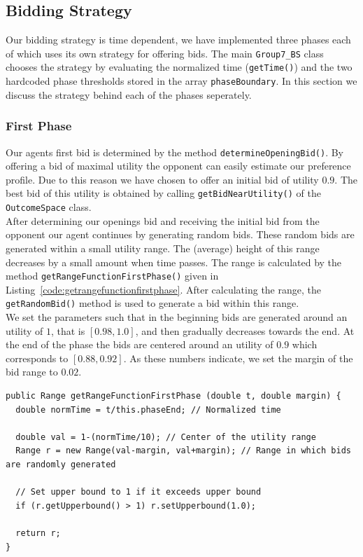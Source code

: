 \documentclass[a4paper,10pt]{article}
\begin{document}
\subsection{Bidding Strategy}
\label{sec:strategyBS}
Our bidding strategy is time dependent, we have implemented three phases each of which uses its own strategy for offering bids. The main \texttt{Group7\_BS} class chooses the strategy by evaluating the normalized time (\texttt{getTime()}) and the two hardcoded phase thresholds stored in the array \texttt{phaseBoundary}. In this section we discuss the strategy behind each of the phases seperately.

\subsubsection{First Phase}
Our agents first bid is determined by the method \texttt{determineOpeningBid()}. By offering a bid of maximal utility the opponent can easily estimate our preference profile. Due to this reason we have chosen to offer an initial bid of utility $0.9$. The best bid of this utility is obtained by calling \texttt{getBidNearUtility()} of the \texttt{OutcomeSpace} class. \\

After determining our openings bid and receiving the initial bid from the opponent our agent continues by generating random bids. These random bids are generated within a small utility range. The (average) height of this range decreases by a small amount when time passes. The range is calculated by the method \texttt{getRangeFunctionFirstPhase()} given in Listing~\ref{code:getrangefunctionfirstphase}. After calculating the range, the \texttt{getRandomBid()} method is used to generate a bid within this range. \\

We set the parameters such that in the beginning bids are generated around an utility of $1$, that is $[0.98, 1.0]$, and then gradually decreases towards the end. At the end of the phase the bids are centered around an utility of $0.9$ which corresponds to $[0.88, 0.92]$. As these numbers indicate, we set the margin of the bid range to $0.02$.

\clearpage

\begin{lstlisting}[caption=Code for calculating bid range as function of normalized time, label=code:getrangefunctionfirstphase]
public Range getRangeFunctionFirstPhase (double t, double margin) {
  double normTime = t/this.phaseEnd; // Normalized time

  double val = 1-(normTime/10); // Center of the utility range
  Range r = new Range(val-margin, val+margin); // Range in which bids are randomly generated
    
  // Set upper bound to 1 if it exceeds upper bound
  if (r.getUpperbound() > 1) r.setUpperbound(1.0);
    
  return r;
}
\end{lstlisting}
\end{document}
